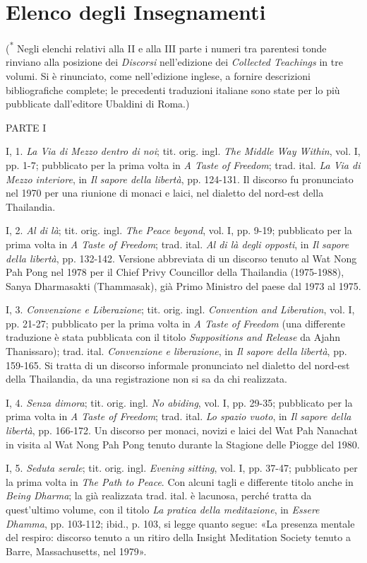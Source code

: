 \chapter{Elenco degli Insegnamenti}

(\textsuperscript{*} Negli elenchi relativi alla II e alla III parte i numeri
tra parentesi tonde rinviano alla posizione dei \emph{Discorsi} nell'edizione
dei \emph{Collected Teachings} in tre volumi. Si è rinunciato, come
nell'edizione inglese, a fornire descrizioni bibliografiche complete; le
precedenti traduzioni italiane sono state per lo più pubblicate dall'editore
Ubaldini di Roma.)

PARTE I

I, 1. \emph{La Via di Mezzo dentro di noi}; tit. orig. ingl. \emph{The
Middle Way Within}, vol. I, pp. 1-7; pubblicato per la prima volta in
\emph{A Taste of Freedom}; trad. ital. \emph{La Via di Mezzo interiore},
in \emph{Il sapore della libertà}, pp. 124-131. Il discorso fu
pronunciato nel 1970 per una riunione di monaci e laici, nel dialetto
del nord-est della Thailandia.

I, 2. \emph{Al di là}; tit. orig. ingl. \emph{The Peace beyond}, vol. I,
pp. 9-19; pubblicato per la prima volta in \emph{A Taste of Freedom};
trad. ital. \emph{Al di là degli opposti}, in \emph{Il sapore della
libertà}, pp. 132-142. Versione abbreviata di un discorso tenuto al Wat
Nong Pah Pong nel 1978 per il Chief Privy Councillor della Thailandia
(1975-1988), Sanya Dharmasakti (Thammasak), già Primo Ministro del paese
dal 1973 al 1975.

I, 3. \emph{Convenzione e Liberazione}; tit. orig. ingl.
\emph{Convention and Liberation}, vol. I, pp. 21-27; pubblicato per la
prima volta in \emph{A Taste of Freedom} (una differente traduzione è
stata pubblicata con il titolo \emph{Suppositions and Release} da Ajahn
Thanissaro); trad. ital. \emph{Convenzione e liberazione}, in \emph{Il
sapore della libertà}, pp. 159-165. Si tratta di un discorso informale
pronunciato nel dialetto del nord-est della Thailandia, da una
registrazione non si sa da chi realizzata.

I, 4. \emph{Senza dimora}; tit. orig. ingl. \emph{No abiding}, vol. I,
pp. 29-35; pubblicato per la prima volta in \emph{A Taste of Freedom};
trad. ital. \emph{Lo spazio vuoto}, in \emph{Il sapore della libertà},
pp. 166-172. Un discorso per monaci, novizi e laici del Wat Pah Nanachat
in visita al Wat Nong Pah Pong tenuto durante la Stagione delle Piogge
del 1980.

I, 5. \emph{Seduta serale}; tit. orig. ingl. \emph{Evening sitting},
vol. I, pp. 37-47; pubblicato per la prima volta in \emph{The Path to
Peace}. Con alcuni tagli e differente titolo anche in \emph{Being
Dharma}; la già realizzata trad. ital. è lacunosa, perché tratta da
quest'ultimo volume, con il titolo \emph{La pratica della meditazione},
in \emph{Essere Dhamma}, pp. 103-112; ibid., p. 103, si legge quanto
segue: «La presenza mentale del respiro: discorso tenuto a un ritiro
della Insight Meditation Society tenuto a Barre, Massachusetts, nel
1979».

